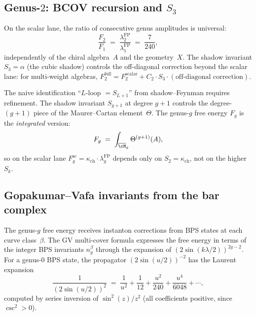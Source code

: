 \subsection{Genus-\texorpdfstring{$2$}{2}: BCOV recursion and \texorpdfstring{$S_3$}{S-3}}
\label{subsec:genus-2-bcov}

\begin{proposition}
\label{prop:f2-f1-ratio}
On the scalar lane, the ratio of consecutive genus amplitudes is universal:
\[
 \frac{F_2}{F_1} \;=\; \frac{\lambda_2^{\mathrm{FP}}}{\lambda_1^{\mathrm{FP}}} \;=\; \frac{7}{240},
\]
independently of the chiral algebra~$A$ and the geometry~$X$. The shadow invariant $S_3 = \alpha$ \textup{(}the cubic shadow\textup{)} controls the off-diagonal correction beyond the scalar lane: for multi-weight algebras, $F_2^{\mathrm{full}} = F_2^{\mathrm{scalar}} + C_2 \cdot S_3 \cdot (\text{off-diagonal correction})$.
\end{proposition}

\begin{remark}
\label{rem:shadow-feynman-rule}
The naive identification ``$L$-loop $= S_{L+1}$'' from shadow--Feynman requires refinement. The shadow invariant $S_{g+1}$ at degree $g+1$ controls the degree-$(g+1)$ piece of the Maurer--Cartan element~$\Theta$. The genus-$g$ free energy $F_g$ is the \emph{integrated} version:
\[
 F_g \;=\; \int_{\overline{\cM}_g} \Theta^{(g+1)}(A),
\]
so on the scalar lane $F_g^{\mathrm{sc}} =
\kappa_{\mathrm{ch}} \cdot \lambda_g^{\mathrm{FP}}$ depends only on
$S_2 = \kappa_{\mathrm{ch}}$, not on the higher $S_k$.
\end{remark}

\subsection{Gopakumar--Vafa invariants from the bar complex}
\label{subsec:gv-from-bar}

The genus-$g$ free energy receives instanton corrections from BPS states at each curve class~$\beta$. The GV multi-cover formula \cite{GV} expresses the free energy in terms of the integer BPS invariants $n_g^\beta$ through the expansion of $(2\sin(k\lambda/2))^{2g-2}$. For a genus-$0$ BPS state, the propagator $(2\sin(u/2))^{-2}$ has the Laurent expansion
\[
 \frac{1}{(2\sin(u/2))^2} \;=\; \frac{1}{u^2} + \frac{1}{12} + \frac{u^2}{240} + \frac{u^4}{6048} + \cdots,
\]
computed by series inversion of $\sin^2(z)/z^2$ \textup{(}all coefficients positive, since $\csc^2 > 0$\textup{)}.

